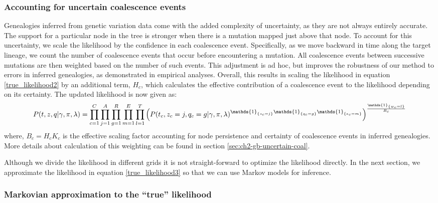 \subsubsection{Accounting for uncertain coalescence events}

Genealogies inferred from genetic variation data come with the added complexity of uncertainty, as they are not always entirely accurate. The support for a particular node in the tree is stronger when there is a mutation mapped just above that node. To account for this uncertainty, we scale the likelihood by the confidence in each coalescence event. Specifically, as we move backward in time along the target lineage, we count the number of coalescence events that occur before encountering a mutation. All coalescence events between successive mutations are then weighted based on the number of such events. This adjustment is ad hoc, but improves the robustness of our method to errors in inferred genealogies, as demonstrated in empirical analyses. Overall, this results in scaling the likelihood in equation \ref{true_likelihood2} by an additional term, $H_c$, which calculates the effective contribution of a coalescence event to the likelihood depending on its certainty. The updated likelihood is now given as:
\begin{equation}
    \footnotesize
    P(t,z,q \vert \gamma, \pi, \lambda) = \prod_{c=1}^{C} \prod_{j = 1}^A \prod_{g =1}^{R} \prod_{m = 1}^E \prod_{l =1}^{T} \left( P(t_c,z_c = j,q_c=g \vert \gamma, \pi, \lambda)^{\mathds{1}_{\{z_c = j\}} \mathds{1}_{\{q_c = g\}} \mathds{1}_{\{e_c = m\}}} \right) ^{\frac{\mathds{1}_{\{w_c = l\}}}{B_c}}
\label{true_likelihood3}
\end{equation}
where, $B_c = H_cK_c$ is the effective scaling factor accounting for node persistence and certainty of coalescence events in inferred genealogies. More details about calculation of this weighting can be found in section \ref{sec:ch2-gb-uncertain-coal}.

Although we divide the likelihood in different grids it is not straight-forward to optimize the likelihood directly. In the next section, we approximate the likelihood in equation \ref{true_likelihood3} so that we can use Markov models for inference. 

\subsubsection{Markovian approximation to the ``true'' likelihood}


